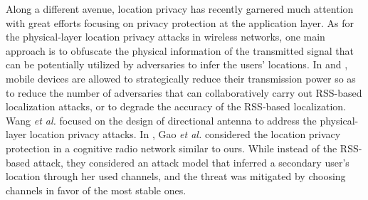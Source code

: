 Along a different avenue, location privacy has recently garnered much attention with great efforts focusing on privacy protection  at the application layer. 
As for the physical-layer location privacy attacks in wireless networks, one main approach is to obfuscate the physical information of the transmitted signal that can be potentially utilized by adversaries to infer the users' locations. In \cite{Jiang07} and \cite{EI10}, mobile devices are allowed to strategically reduce their transmission power so as to reduce the number of adversaries that can collaboratively carry out RSS-based localization attacks, or to degrade the accuracy of the RSS-based localization. Wang {\em et al.} focused on the design of directional antenna to address the physical-layer location privacy attacks. In \cite{location}, Gao {\em et al.}  considered the location privacy protection in a cognitive radio network similar to ours. While instead of the RSS-based attack, they considered an attack model that inferred a secondary user's location through her used channels, and the threat was mitigated by choosing channels in favor of the most stable ones.


